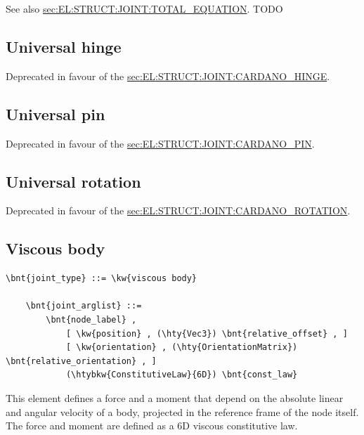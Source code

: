 See also 
\hyperref{\kw{total equation}}{\kw{total equation} (see Section~}{)}{sec:EL:STRUCT:JOINT:TOTAL_EQUATION}.
TODO




\subsection{Universal hinge}
\label{sec:EL:STRUCT:JOINT:UNIVERSAL_HINGE}
Deprecated in favour of the
\hyperref{\kw{cardano hinge}}{\kw{cardano hinge} (see Section~}{)}{sec:EL:STRUCT:JOINT:CARDANO_HINGE}.



\subsection{Universal pin}
\label{sec:EL:STRUCT:JOINT:UNIVERSAL_PIN}
Deprecated in favour of the
\hyperref{\kw{cardano pin}}{\kw{cardano pin} (see Section~}{)}{sec:EL:STRUCT:JOINT:CARDANO_PIN}.



\subsection{Universal rotation}
\label{sec:EL:STRUCT:JOINT:UNIVERSAL_ROTATION}
Deprecated in favour of the
\hyperref{\kw{cardano rotation}}{\kw{cardano rotation} (see Section~}{)}{sec:EL:STRUCT:JOINT:CARDANO_ROTATION}.

\subsection{Viscous body}
\label{sec:EL:STRUCT:JOINT:VISCOUS_BODY}
\begin{Verbatim}[commandchars=\\\{\}]
    \bnt{joint_type} ::= \kw{viscous body}

    \bnt{joint_arglist} ::=
        \bnt{node_label} ,
            [ \kw{position} , (\hty{Vec3}) \bnt{relative_offset} , ]
            [ \kw{orientation} , (\hty{OrientationMatrix}) \bnt{relative_orientation} , ]
            (\htybkw{ConstitutiveLaw}{6D}) \bnt{const_law}
\end{Verbatim}
This element defines a force and a moment that depend on the absolute 
linear and angular velocity of a body, projected in the reference frame
of the node itself.
The force and moment are defined as a 6D viscous constitutive law.


